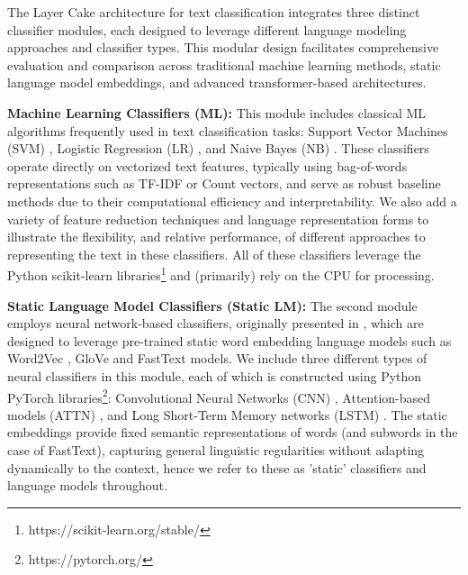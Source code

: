 \documentclass[final]{clv2025}
\begin{document}
The Layer Cake architecture for text classification integrates three distinct classifier modules, each designed to leverage different language modeling approaches and classifier types. This modular design facilitates comprehensive evaluation and comparison across traditional machine learning methods, static language model embeddings, and advanced transformer-based architectures.

\textbf{Machine Learning Classifiers (ML):} This module includes classical ML algorithms frequently used in text classification tasks: Support Vector Machines (SVM) \cite{joachims1998text}, Logistic Regression (LR) \cite{genkin01082007}, and Naive Bayes (NB) \cite{mccallum1998comparison}. These classifiers operate directly on vectorized text features, typically using bag-of-words representations such as TF-IDF or Count vectors, and serve as robust baseline methods due to their computational efficiency and interpretability. We also add a variety of feature reduction techniques and language representation forms to illustrate the flexibility, and relative performance, of different approaches to representing the text in these classifiers. All of these classifiers leverage the Python scikit-learn libraries\footnote{https://scikit-learn.org/stable/} and (primarily) rely on the CPU for processing.

\textbf{Static Language Model Classifiers (Static LM):} The second module employs neural network-based classifiers, originally presented in \cite{moreo2021}, which are designed to leverage pre-trained static word embedding language models such as Word2Vec \cite{mikolov}, GloVe \cite{pennington} and FastText \cite{articleboja} models. We include three different types of neural classifiers in this module, each of which is constructed using Python PyTorch libraries\footnote{https://pytorch.org/}: Convolutional Neural Networks (CNN) \cite{yoon2014convolutional}, Attention-based models (ATTN) \cite{liuguo2019bidirectional}, and Long Short-Term Memory networks (LSTM) \cite{hochreiterlong}. The static embeddings provide fixed semantic representations of words (and subwords in the case of FastText), capturing general linguistic regularities without adapting dynamically to the context, hence we refer to these as 'static' classifiers and language models throughout.
\end{document}
